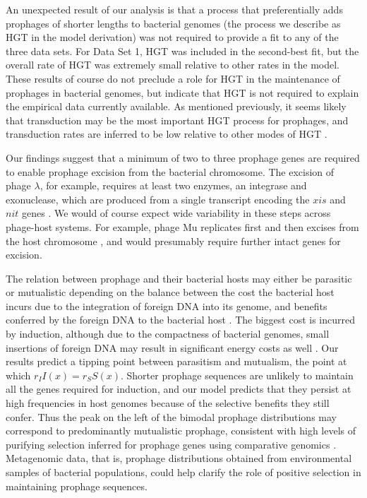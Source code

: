 An unexpected result of our analysis is that a process that preferentially adds prophages of shorter lengths to bacterial genomes (the process we describe as HGT in the model derivation) was not required to provide a fit to any of the three data sets.  For Data Set 1, HGT was included in the second-best fit, but the overall rate of HGT was extremely small relative to other rates in the model.  These results of course do not preclude a role for HGT in the maintenance of prophages in bacterial genomes, but indicate that HGT is not required to explain the empirical data currently available.  As mentioned previously, it seems likely that transduction may be the most important HGT process for prophages, and transduction rates are inferred to be low relative to other modes of HGT \citep{volkova_modeling_2014}.

Our findings suggest that a minimum of two to three prophage genes are required to enable prophage excision from the bacterial chromosome. The excision of phage $\lambda$, for example, requires at least two enzymes, an integrase and  exonuclease, which are produced from a single transcript encoding the $xis$ and $nit$ genes \citep{weitz_quantitative_2017}. We would of course expect wide variability in these steps across phage-host systems.  For example, phage Mu replicates first and then excises from the host chromosome \citep{10.2307/66893}, and would presumably require further intact genes for excision.

The relation between prophage and their bacterial hosts may either be parasitic or mutualistic depending on the balance between the cost the bacterial host incurs due to the integration of foreign DNA into its genome, and benefits conferred by the foreign DNA to the bacterial host \citep{shapiro_evolution_2018}. The biggest cost is incurred by induction, although due to the compactness of bacterial genomes, small insertions of foreign DNA may result in significant energy costs as well \citep{koonin_evolution_2009}.  Our results predict a tipping point between parasitism and mutualism, the point at which $r_I I(x) = r_S S(x)$.  Shorter prophage sequences are unlikely to maintain all the genes required for induction, and our model predicts that they persist at high frequencies in host genomes because of the selective benefits they still confer.  Thus the peak on the left of the bimodal prophage distributions may correspond to predominantly mutualistic prophage, consistent with high levels of purifying selection inferred for prophage genes using comparative genomics \citep{bobay_pervasive_2014}.  Metagenomic data, that is, prophage distributions obtained from environmental samples of bacterial populations, could help clarify the role of positive selection in maintaining prophage sequences.

